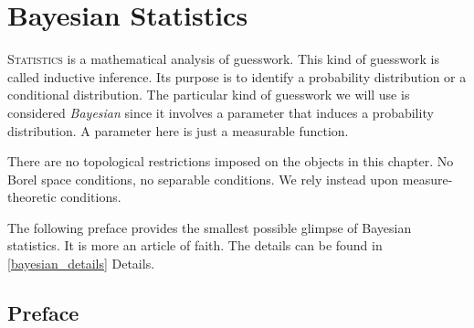 \documentclass[
twoside=true,
paper=letter,
fontsize=11pt,
pagesize=auto,
leqno,
openany,
headsepline,
overfullrule,
]{scrbook}
\theoremstyle{plain}
\theoremstyle{plain}
\theoremstyle{definition}
\theoremstyle{bfnoteitalic}
\theoremstyle{bfnoteroman}
\begin{document}
\chapter{Bayesian Statistics}\label{bayesian_statistics}
\lettrine{S}{tatistics} is a mathematical analysis of guesswork. This kind of guesswork is called inductive inference.
Its purpose is to identify a probability distribution or a conditional distribution. The particular kind of guesswork we will use is considered \emph{Bayesian} since it involves a parameter that induces a  probability distribution. A parameter here is just a measurable function.

There are no topological restrictions imposed on the objects in this chapter. No Borel space conditions, no separable conditions.  We rely instead upon measure-theoretic conditions.

The following preface provides the smallest possible glimpse of Bayesian statistics. It is more an article of faith.
The details can be found in \textsf{\ref{bayesian_details} Details}.


\section{Preface}\label{bayesian_preface}
\end{document}
